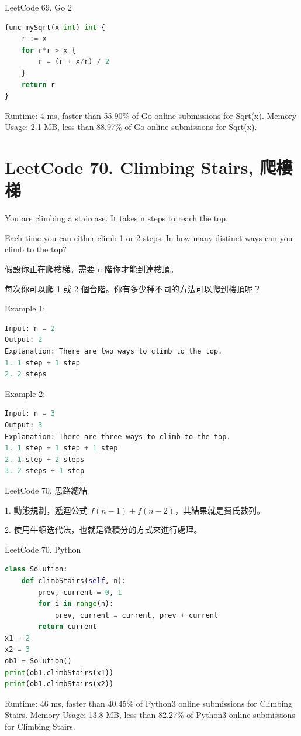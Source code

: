 \documentclass[10pt,UTF8]{ctexart}
\begin{document}
LeetCode 69. Go 2

\begin{lstlisting}[language={python}]
func mySqrt(x int) int {
    r := x
    for r*r > x {
        r = (r + x/r) / 2
    }
    return r
}
\end{lstlisting}
Runtime: 4 ms, faster than 55.90\% of Go online submissions for Sqrt(x).
Memory Usage: 2.1 MB, less than 88.97\% of Go online submissions for Sqrt(x).


\section{LeetCode 70. Climbing Stairs, 爬樓梯}

You are climbing a staircase. It takes n steps to reach the top.

Each time you can either climb 1 or 2 steps. In how many distinct ways can you climb to the top?

假設你正在爬樓梯。需要 n 階你才能到達樓頂。

每次你可以爬 1 或 2 個台階。你有多少種不同的方法可以爬到樓頂呢？

Example 1:
\begin{lstlisting}[language={python}]
Input: n = 2
Output: 2
Explanation: There are two ways to climb to the top.
1. 1 step + 1 step
2. 2 steps
\end{lstlisting}

Example 2:
\begin{lstlisting}[language={python}]
Input: n = 3
Output: 3
Explanation: There are three ways to climb to the top.
1. 1 step + 1 step + 1 step
2. 1 step + 2 steps
3. 2 steps + 1 step
\end{lstlisting}

LeetCode 70. 思路總結

1. 動態規劃，遞迴公式 $f(n-1)+f(n-2)$，其結果就是費氏數列。

2. 使用牛頓迭代法，也就是微積分的方式來進行處理。

LeetCode 70. Python

\begin{lstlisting}[language={python}]
class Solution:
    def climbStairs(self, n):
        prev, current = 0, 1
        for i in range(n):
            prev, current = current, prev + current
        return current
x1 = 2
x2 = 3
ob1 = Solution()
print(ob1.climbStairs(x1))
print(ob1.climbStairs(x2))
\end{lstlisting}
Runtime: 46 ms, faster than 40.45\% of Python3 online submissions for Climbing Stairs.
Memory Usage: 13.8 MB, less than 82.27\% of Python3 online submissions for Climbing Stairs.
\end{document}
